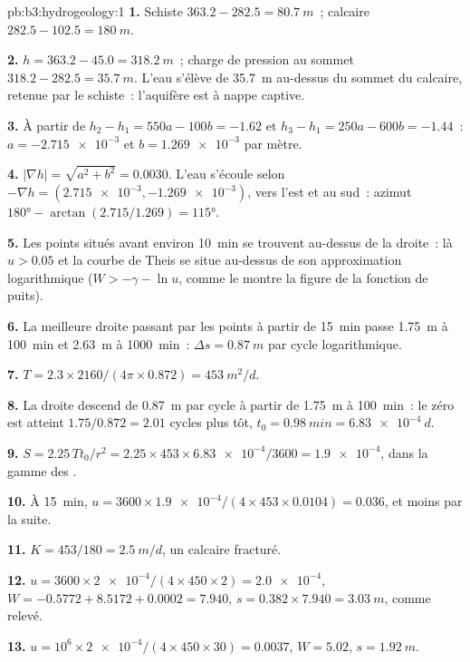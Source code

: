 \begin{solution}{pb:b3:hydrogeology:1}
\textbf{1.} Schiste $363.2 - 282.5 = \qty{80.7}{m}$~; calcaire $282.5 -
102.5 = \qty{180}{m}$.

\textbf{2.} $h = 363.2 - 45.0 = \qty{318.2}{m}$~; charge de pression au sommet
$318.2 - 282.5 = \qty{35.7}{m}$. L'eau s'élève de \qty{35.7}{m} au-dessus du
sommet du calcaire, retenue par le schiste~: l'aquifère est à nappe captive.

\textbf{3.} À partir de $h_2 - h_1 = 550a - 100b = -1.62$ et $h_3 - h_1 = 250a
- 600b = -1.44$~: $a = \num{-2.715e-3}$ et $b = \num{1.269e-3}$ par
mètre.

\textbf{4.} $|\nabla h| = \sqrt{a^2 + b^2} = \num{0.0030}$. L'eau
s'écoule selon $-\nabla h = (\num{2.715e-3}, \num{-1.269e-3})$, vers l'est et
au sud~: azimut $\ang{180} - \arctan(2.715/1.269) = \ang{115}$.

\textbf{5.} Les points situés avant environ \qty{10}{min} se trouvent au-dessus de la droite~: là
$u > 0.05$ et la courbe de Theis se situe au-dessus de son approximation logarithmique
($W > -\gamma - \ln u$, comme le montre la figure de la fonction de puits).

\textbf{6.} La meilleure droite passant par les points à partir de \qty{15}{min} passe
\qty{1.75}{m} à \qty{100}{min} et \qty{2.63}{m} à \qty{1000}{min}~:
$\Delta s = \qty{0.87}{m}$ par cycle logarithmique.

\textbf{7.} $T = 2.3\times2160/(4\pi\times0.872) = \qty{453}{m^2/d}$.

\textbf{8.} La droite descend de \qty{0.87}{m} par cycle à partir de \qty{1.75}{m} à
\qty{100}{min}~: le zéro est atteint $1.75/0.872 = 2.01$ cycles plus tôt,
$t_0 = \qty{0.98}{min} = \qty{6.83e-4}{d}$.

\textbf{9.} $S = 2.25\,Tt_0/r^2 = 2.25\times453\times\num{6.83e-4}/3600 =
\num{1.9e-4}$, dans la gamme des .

\textbf{10.} À \qty{15}{min}, $u = 3600\times\num{1.9e-4}/(4\times453
\times0.0104) = \num{0.036}$, et moins par la suite.

\textbf{11.} $K = 453/180 = \qty{2.5}{m/d}$, un calcaire fracturé.

\textbf{12.} $u = 3600\times\num{2e-4}/(4\times450\times2) =
\num{2.0e-4}$, $W = -0.5772 + 8.5172 + 0.0002 = \num{7.940}$, $s =
0.382\times7.940 = \qty{3.03}{m}$, comme relevé.

\textbf{13.} $u = 10^6\times\num{2e-4}/(4\times450\times30) =
\num{0.0037}$, $W = \num{5.02}$, $s = \qty{1.92}{m}$.


\end{solution}
